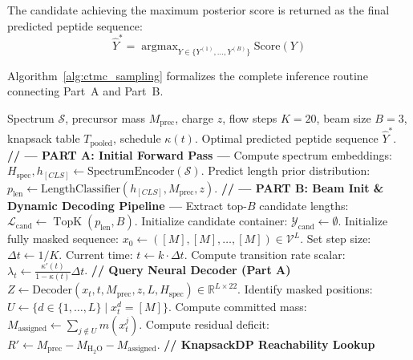 The candidate achieving the maximum posterior score is returned as the final predicted peptide sequence:
\begin{equation}
\hat{Y}^* = \operatorname{argmax}_{Y \in \{Y^{(1)}, \dots, Y^{(B)}\}} \text{Score}(Y)
\label{eq:optimal_peptide}
\end{equation}

Algorithm~\ref{alg:ctmc_sampling} formalizes the complete inference routine connecting Part~A and Part~B.

\begin{algorithm}[!ht]
\caption{Continuous-Time Discrete Flow Sampling with KnapsackDP and Beam Decoding}
\label{alg:ctmc_sampling}
\begin{algorithmic}[1]
\Require Spectrum $\mathcal{S}$, precursor mass $M_{\text{prec}}$, charge $z$, flow steps $K=20$, beam size $B=3$, knapsack table $T_{\text{pooled}}$, schedule $\kappa(t)$.
\Ensure Optimal predicted peptide sequence $\hat{Y}^*$.
\State \textbf{// --- PART A: Initial Forward Pass ---}
\State Compute spectrum embeddings: $H_{\text{spec}}, h_{[CLS]} \gets \text{SpectrumEncoder}(\mathcal{S})$.
\State Predict length prior distribution: $p_{\text{len}} \gets \text{LengthClassifier}(h_{[CLS]}, M_{\text{prec}}, z)$.
\State \textbf{// --- PART B: Beam Init \& Dynamic Decoding Pipeline ---}
\State Extract top-$B$ candidate lengths: $\mathcal{L}_{\text{cand}} \gets \operatorname{TopK}(p_{\text{len}}, B)$.
\State Initialize candidate container: $\mathcal{Y}_{\text{cand}} \gets \emptyset$.
    \State Initialize fully masked sequence: $x_0 \gets ([M], [M], \dots, [M]) \in \mathcal{V}^L$.
    \State Set step size: $\Delta t \gets 1 / K$.
        \State Current time: $t \gets k \cdot \Delta t$.
        \State Compute transition rate scalar: $\lambda_t \gets \frac{\kappa'(t)}{1 - \kappa(t)} \Delta t$.
        \State \textbf{// Query Neural Decoder (Part A)}
        \State $Z \gets \text{Decoder}(x_t, t, M_{\text{prec}}, z, L, H_{\text{spec}}) \in \mathbb{R}^{L \times 22}$.
        \State Identify masked positions: $U \gets \{d \in \{1, \dots, L\} \mid x_t^d = [M]\}$.
        \State Compute committed mass: $M_{\text{assigned}} \gets \sum_{j \notin U} m(x_t^j)$.
        \State Compute residual deficit: $R' \gets M_{\text{prec}} - M_{\text{H}_2\text{O}} - M_{\text{assigned}}$.
                \State \textbf{// KnapsackDP Reachability Lookup}

\end{algorithmic}
\end{algorithm}
